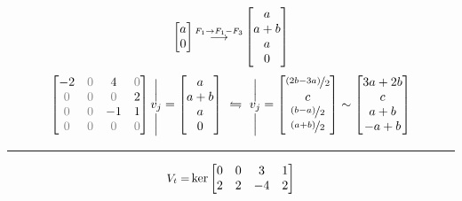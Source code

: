 {{\[\begin{bmatrix}
    a \\
    0
    \end{bmatrix} 
    \text{\small $ \overset{F_1 \to F_1 - F_3}{\longrightarrow }$}
    \begin{bmatrix}
    a \\ 
    a+b \\ 
    a \\
    0
    \end{bmatrix}
    \] 
\[\begin{bmatrix}
    -2 & \textcolor{gray}{0} & 4 & \textcolor{gray}{0} \\
    \textcolor{gray}{0} & \textcolor{gray}{0} & \textcolor{gray}{0} & 2 \\
    \textcolor{gray}{0} & \textcolor{gray}{0} & -1 & 1 \\
    \textcolor{gray}{0} & \textcolor{gray}{0} & \textcolor{gray}{0} & \textcolor{gray}{0} 
\end{bmatrix} 
\overset{\Big|}{\underset{\Big|}{v_j}}
 = \begin{bmatrix}
    a \\ a+b \\ a \\ 0
\end{bmatrix} \ \leftrightharpoons \ 
\overset{\Big|}{\underset{\Big|}{v_j}}
= \begin{bmatrix}
    \nicefrac{(2b -3a)}{2} \\ c \\ \nicefrac{(b-a)}{2} \\ \nicefrac{(a+b)}{2}  
\end{bmatrix} \sim \begin{bmatrix}
    3a + 2b \\ c \\  a +b \\ -a+b  
\end{bmatrix}
\]
\- \hrule \vspace{0.2cm}
{\footnotesize \[ \text{\small$ V_t = $}\ker\begin{bmatrix}
    0 & 0 & 3 & 1 \\
    2 & 2 & -4 & 2 \\

\end{bmatrix}\]}}}
